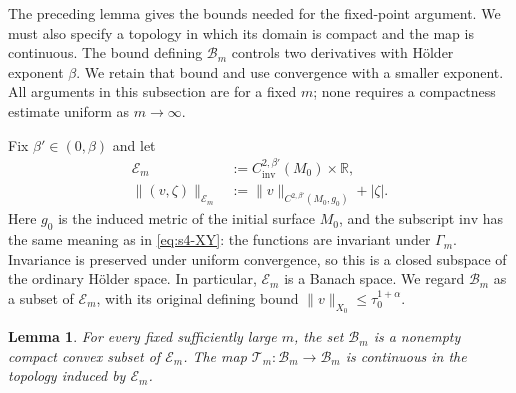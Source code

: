\documentclass[a4paper,11pt,oneside,reqno]{amsart}
\numberwithin{equation}{section}
\newtheorem{lemma}[theorem]{Lemma}
\theoremstyle{definition}
\begin{document}
The preceding lemma gives the bounds needed for the fixed-point
argument. We must also specify a topology in which its domain is
compact and the map is continuous. The bound defining
$\mathcal B_m$ controls two derivatives with H\"older exponent
$\beta$. We retain that bound and use convergence with a smaller
exponent. All arguments in this subsection are for a fixed $m$;
none requires a compactness estimate uniform as $m\to\infty$.

Fix $\beta'\in(0,\beta)$ and let
%
\begin{align*}
    \mathcal E_m
    &:=C^{2,\beta'}_{\mathrm{inv}}(M_0)\times\mathbb R,\\
    \|(v,\zeta)\|_{\mathcal E_m}
    &:=\|v\|_{C^{2,\beta'}(M_0,g_0)}+|\zeta|.
\end{align*}
%
Here $g_0$ is the induced metric of the initial surface $M_0$,
and the subscript $\mathrm{inv}$ has the same meaning as in
\eqref{eq:s4-XY}: the functions are invariant under $\Gamma_m$.
Invariance is preserved under uniform convergence, so this is
a closed subspace of the ordinary H\"older space. In particular,
$\mathcal E_m$ is a Banach space. We regard $\mathcal B_m$ as
a subset of $\mathcal E_m$, with its original defining bound
$\|v\|_{X_0}\leq\tau_0^{1+\alpha}$.

\begin{lemma}
    \label{lem:s4-coupled-compactness}
    For every fixed sufficiently large $m$, the set
    $\mathcal B_m$ is a nonempty compact convex subset of
    $\mathcal E_m$. The map
    $\mathcal T_m:\mathcal B_m\to\mathcal B_m$ is continuous
    in the topology induced by $\mathcal E_m$.
\end{lemma}
\end{document}
